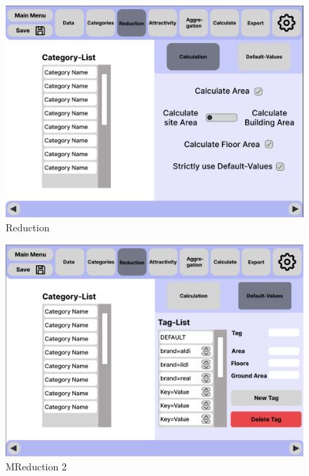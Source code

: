 \documentclass[parskip=full]{scrartcl} %
\begin{document}
\begin{figure}
    \centering
    \includegraphics[width=1\textwidth]{pictures/Reduction.png}
    \caption{Reduction}
\end{figure}

\begin{figure}
    \centering
    \includegraphics[width=1\textwidth]{pictures/Reduction 2.png}
    \caption{MReduction 2}
\end{figure}
\end{document}
